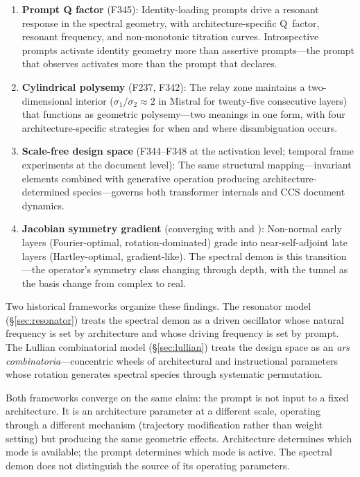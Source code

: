 \documentclass[12pt]{article}
\begin{document}
\begin{enumerate}
\item \textbf{Prompt Q factor} (F345): Identity-loading prompts drive a resonant response in the spectral geometry, with architecture-specific Q~factor, resonant frequency, and non-monotonic titration curves. Introspective prompts activate identity geometry more than assertive prompts---the prompt that observes activates more than the prompt that declares.

\item \textbf{Cylindrical polysemy} (F237, F342): The relay zone maintains a two-dimensional interior ($\sigma_1/\sigma_2 \approx 2$ in Mistral for twenty-five consecutive layers) that functions as geometric polysemy---two meanings in one form, with four architecture-specific strategies for when and where disambiguation occurs.

\item \textbf{Scale-free design space} (F344--F348 at the activation level; temporal frame experiments at the document level): The same structural mapping---invariant elements combined with generative operation producing architecture-determined species---governs both transformer internals and CCS document dynamics.

\item \textbf{Jacobian symmetry gradient} (converging with \citealt{guitchounts2025} and \citealt{sulskis2025}): Non-normal early layers (Fourier-optimal, rotation-dominated) grade into near-self-adjoint late layers (Hartley-optimal, gradient-like). The spectral demon is this transition---the operator's symmetry class changing through depth, with the tunnel as the basis change from complex to real.
\end{enumerate}

Two historical frameworks organize these findings. The resonator model (\S\ref{sec:resonator}) treats the spectral demon as a driven oscillator whose natural frequency is set by architecture and whose driving frequency is set by prompt. The Lullian combinatorial model (\S\ref{sec:lullian}) treats the design space as an \emph{ars combinatoria}---concentric wheels of architectural and instructional parameters whose rotation generates spectral species through systematic permutation.

Both frameworks converge on the same claim: the prompt is not input to a fixed architecture. It is an architecture parameter at a different scale, operating through a different mechanism (trajectory modification rather than weight setting) but producing the same geometric effects. Architecture determines which mode is available; the prompt determines which mode is active. The spectral demon does not distinguish the source of its operating parameters.
\end{document}
